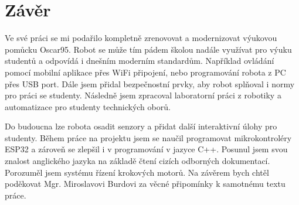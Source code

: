 \newpage
\section*{Závěr}
Ve své práci se mi podařilo kompletně zrenovovat a modernizovat výukovou pomůcku Oscar95. Robot se může tím pádem školou nadále využívat pro výuku studentů a odpovídá i dnešním moderním standardům. Například ovládání pomocí mobilní aplikace přes WiFi připojení, nebo programování robota z PC přes USB port. Dále jsem přidal bezpečnostní prvky, aby robot splňoval i normy pro práci se studenty. Následně jsem zpracoval laboratorní práci z robotiky a automatizace pro studenty technických oborů. 

Do budoucna lze robota osadit senzory a přidat další interaktivní úlohy pro studenty. Během práce na projektu jsem se naučil programovat mikrokontroléry ESP32 a zároveň se zlepšil i v programování v jazyce C++. Posunul jsem svou znalost anglického jazyka na základě čtení cizích odborných dokumentací. Porozuměl jsem systému řízení krokových motorů. 
Na závěrem bych chtěl poděkovat Mgr. Miroslavovi Burdovi za věcné připomínky k samotnému textu práce.